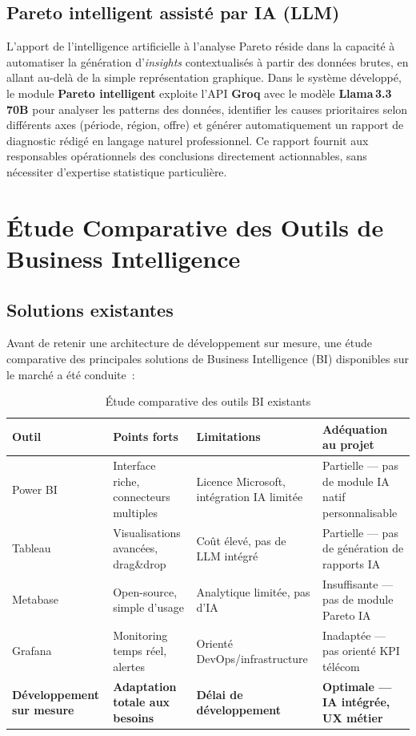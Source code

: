 \documentclass[10pt,a4paper]{report}
\begin{document}
\subsection{Pareto intelligent assisté par IA (LLM)}

L'apport de l'intelligence artificielle à l'analyse Pareto réside dans la capacité à automatiser la génération d'\textit{insights} contextualisés à partir des données brutes, en allant au-delà de la simple représentation graphique. Dans le système développé, le module \textbf{Pareto intelligent} exploite l'API \textbf{Groq} avec le modèle \textbf{Llama\,3.3\,70B} pour analyser les patterns des données, identifier les causes prioritaires selon différents axes (période, région, offre) et générer automatiquement un rapport de diagnostic rédigé en langage naturel professionnel. Ce rapport fournit aux responsables opérationnels des conclusions directement actionnables, sans nécessiter d'expertise statistique particulière.

\section{Étude Comparative des Outils de Business Intelligence}

\subsection{Solutions existantes}

Avant de retenir une architecture de développement sur mesure, une étude comparative des principales solutions de Business Intelligence (BI) disponibles sur le marché a été conduite~:

\begin{table}[H]
\centering
\caption{Étude comparative des outils BI existants}
\begin{tabularx}{\textwidth}{L{2.5cm} L{3cm} L{3cm} L{4.5cm}}
\toprule
{}
\textbf{\color{ttblue}Outil} & \textbf{\color{ttblue}Points forts} & \textbf{\color{ttblue}Limitations} & \textbf{\color{ttblue}Adéquation au projet} \\
\midrule
Power BI & Interface riche, connecteurs multiples & Licence Microsoft, intégration IA limitée & Partielle --- pas de module IA natif personnalisable \\
Tableau  & Visualisations avancées, drag\&drop & Coût élevé, pas de LLM intégré & Partielle --- pas de génération de rapports IA \\
Metabase & Open-source, simple d'usage & Analytique limitée, pas d'IA & Insuffisante --- pas de module Pareto IA \\
Grafana  & Monitoring temps réel, alertes & Orienté DevOps/infrastructure & Inadaptée --- pas orienté KPI télécom \\
\textbf{Développement sur mesure} & \textbf{Adaptation totale aux besoins} & \textbf{Délai de développement} & \textbf{Optimale --- IA intégrée, UX métier} \\
\bottomrule
\end{tabularx}
\label{tab:bi-compare}
\end{table}
\end{document}
